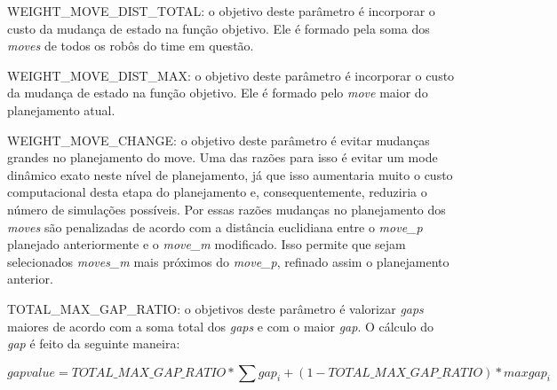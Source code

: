 WEIGHT_MOVE_DIST_TOTAL: o objetivo deste parâmetro é incorporar o custo da
mudança de estado na função objetivo. Ele é formado pela soma dos \textit{
moves} de todos os robôs do time em questão.

WEIGHT_MOVE_DIST_MAX: o objetivo deste parâmetro é incorporar o custo da
mudança de estado na função objetivo. Ele é formado pelo \textit{move}
maior do planejamento atual.

WEIGHT_MOVE_CHANGE: o objetivo deste parâmetro é evitar mudanças grandes no
planejamento do move. Uma das razões para isso é evitar um mode dinâmico
exato neste nível de planejamento, já que isso aumentaria muito o custo
computacional desta etapa do planejamento e, consequentemente, reduziria
o número de simulações possíveis. Por essas razões mudanças no planejamento
dos \textit{moves} são penalizadas de acordo com a distância euclidiana
entre o \textit{move_p} planejado anteriormente e o \textit{move_m} modificado.
Isso permite que sejam selecionados \textit{moves_m} mais próximos do
\textit{move_p}, refinado assim o planejamento anterior.


TOTAL_MAX_GAP_RATIO: o objetivos deste parâmetro é valorizar \textit{gaps} maiores
de acordo com a soma total dos \textit{gaps} e com o maior \textit{gap}.
O cálculo do \textit{gap} é feito da seguinte maneira:

\begin{equation} 
 gap value = TOTAL\_MAX\_GAP\_RATIO * \sum gap_i + (1 - TOTAL\_MAX\_GAP\_RATIO) * max{gap_i}
\end{equation} 
